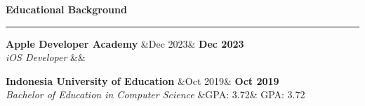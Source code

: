 \documentclass{article}
\newcommand{\header}[1]{
	\vspace{4mm}
	{\large \noindent \textbf{#1}}
	\vspace{1mm}
	\hrule
	\vspace{1mm}
}
\newcommand{\shortitem}[4]{
	\begin{adjustwidth}{}{}
		\textbf{#1} \hfill \ifx&#2& \else \textbf{#2} \fi \\
		\textit{#3} \ifx&#4& \else \hfill #4 \fi
	\end{adjustwidth}
	\vspace{1mm}
}
\begin{document}
\begin{multicols}{2}
		\header{Educational Background}
			\shortitem{Apple Developer Academy}{Dec 2023}{iOS Developer}{}
			\shortitem{Indonesia University of Education}{Oct 2019}{Bachelor of Education in Computer Science}{GPA: 3.72}

	\end{multicols}
\end{document}
